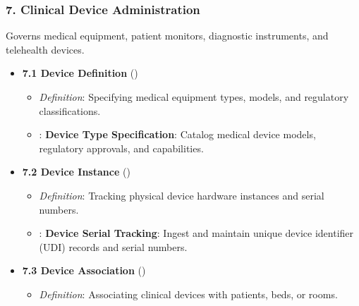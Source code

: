 \subsubsection*{7. Clinical Device Administration}
\label{rad:enabling:216}

Governs medical equipment, patient monitors, diagnostic instruments, and telehealth devices.

\label{rad:enabling:218}

\begin{itemize}

\item
\textbf{7.1 Device Definition} (\texttt{})


\begin{itemize}

\item
\emph{Definition}: Specifying medical equipment types, models, and regulatory classifications.



\item
\texttt{}: \textbf{Device Type Specification}: Catalog medical device models, regulatory approvals, and capabilities.



\end{itemize}


\item
\textbf{7.2 Device Instance} (\texttt{})


\begin{itemize}

\item
\emph{Definition}: Tracking physical device hardware instances and serial numbers.



\item
\texttt{}: \textbf{Device Serial Tracking}: Ingest and maintain unique device identifier (UDI) records and serial numbers.



\end{itemize}


\item
\textbf{7.3 Device Association} (\texttt{})


\begin{itemize}

\item
\emph{Definition}: Associating clinical devices with patients, beds, or rooms.




\end{itemize}
\end{itemize}
